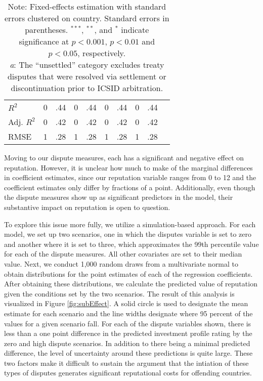 \documentclass[12pt,onesided]{amsart}
\begin{document}
\begin{savenotes}
\begin{table}[ht]
\begin{tabular}{lr@{} lr@{}lr@{}lr@{}lr@{}}
  $R^{2}$ & 0&.44 & 0&.44 & 0&.44 & 0&.44 \\ 
  Adj. $R^{2}$ & 0&.42 & 0&.42 & 0&.42 & 0&.42 \\ 
  RMSE & 1&.28 & 1&.28 & 1&.28 & 1&.28 \\ 
   \hline\hline
\end{tabular}
\caption*{Note: Fixed-effects estimation with standard errors clustered on country. Standard errors in parentheses. $^{***}$, $^{**}$, and $^{*}$ indicate significance at $p<0.001$, $p<0.01$ and $p<0.05$, respectively. \\ \textit{a}: The ``unsettled'' category excludes treaty disputes that were resolved via settlement or discontinuation prior to ICSID arbitration.}
\end{table}
\end{savenotes}


Moving to our dispute measures, each has a significant and negative effect on reputation. However, it is unclear how much to make of the marginal differences in coefficient estimates, since our reputation variable ranges from 0 to 12 and the coefficient estimates only differ by fractions of a point. Additionally, even though the dispute measures show up as significant predictors in the model, their substantive impact on reputation is open to question. 

To explore this issue more fully, we utilize a simulation-based approach. For each model, we set up two scenarios, one in which the disputes variable is set to zero and another where it is set to three, which approximates the 99th percentile value for each of the dispute measures. All other covariates are set to their median value. Next, we conduct 1,000 random draws from a multivariate normal to obtain distributions for the point estimates of each of the regression coefficients. After obtaining these distributions, we calculate the predicted value of reputation given the conditions set by the two scenarios. The result of this analysis is visualized in Figure \ref{fig:subEffect}. A solid circle is used to designate the mean estimate for each scenario and the line widths designate where 95 percent of the values for a given scenario fall. For each of the dispute variables shown, there is less than a one point difference in the predicted investment profile rating by the zero and high dispute scenarios. In addition to there being a minimal predicted difference, the level of uncertainty around these predictions is quite large. These two factors make it difficult to sustain the argument that the intiation of these types of disputes generates significant reputational costs for offending countries.
\end{document}
